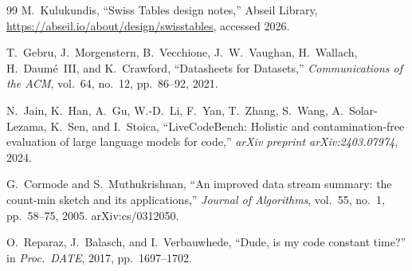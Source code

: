 \begin{thebibliography}{99}
M.~Kulukundis, ``Swiss Tables design notes,'' Abseil Library, \url{https://abseil.io/about/design/swisstables}, accessed 2026.

T.~Gebru, J.~Morgenstern, B.~Vecchione, J.~W.~Vaughan, H.~Wallach, H.~Daum\'e~III, and K.~Crawford, ``Datasheets for Datasets,'' \textit{Communications of the ACM}, vol.~64, no.~12, pp.~86--92, 2021.

N.~Jain, K.~Han, A.~Gu, W.-D.~Li, F.~Yan, T.~Zhang, S.~Wang, A.~Solar-Lezama, K.~Sen, and I.~Stoica, ``LiveCodeBench: Holistic and contamination-free evaluation of large language models for code,'' \textit{arXiv preprint arXiv:2403.07974}, 2024.

G.~Cormode and S.~Muthukrishnan, ``An improved data stream summary: the count-min sketch and its applications,'' \textit{Journal of Algorithms}, vol.~55, no.~1, pp.~58--75, 2005. arXiv:cs/0312050.

O.~Reparaz, J.~Balasch, and I.~Verbauwhede, ``Dude, is my code constant time?'' in \textit{Proc.\ DATE}, 2017, pp.~1697--1702.

\end{thebibliography}
